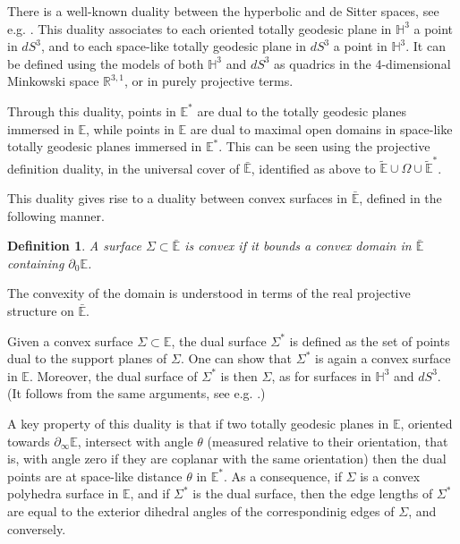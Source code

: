 \documentclass[notitlepage,twoside,a4paper]{amsart}
\newtheorem{definition}[theorem]{\rm\bf Definition}
\theoremstyle{named}
\newcommand{\HH}{{\mathbb H}}
\newcommand{\R}{{\mathbb R}}
\newcommand{\bE}{{\mathbb E}}
\begin{document}
There is a well-known duality between the hyperbolic and de Sitter spaces, see e.g. \cite{HR,shu,fillastre-seppi:spherical}. This duality associates to each oriented totally geodesic plane in $\HH^3$ a point in $dS^3$, and to each space-like totally geodesic plane in $dS^3$ a point in $\HH^3$. It can be defined using the models of both $\HH^3$ and $dS^3$ as quadrics in the 4-dimensional Minkowski space $\R^{3,1}$, or in purely projective terms.

Through this duality, points in $\bE^*$ are dual to the totally geodesic planes immersed in $\bE$, while points in $\bE$ are dual to maximal open domains in space-like totally geodesic planes immersed in $\bE^*$. This can be seen using the projective definition duality, in the universal cover of $\bar\bE$, identified as above to $\tilde\bE\cup \Omega\cup \tilde\bE^*$.

This duality gives rise to a duality between convex surfaces in $\bar \bE$, defined in the following manner.

\begin{definition}
  A surface $\Sigma\subset \bar \bE$ is {\em convex} if it bounds a convex domain in $\bar \bE$ containing $\partial_0\bE$. 
\end{definition}

The convexity of the domain is understood in terms of the real projective structure on $\bar\bE$.

Given a convex surface $\Sigma\subset \bE$, the dual surface $\Sigma^*$ is defined as the set of points dual to the support planes of $\Sigma$. One can show that $\Sigma^*$ is again a convex surface in $\bE$. Moreover, the dual surface of $\Sigma^*$ is then $\Sigma$, as for surfaces in $\HH^3$ and $dS^3$. (It follows from the same arguments, see e.g. \cite{HR,shu}.)

A key property of this duality is that if two totally geodesic planes in $\bE$, oriented towards $\partial_\infty \bE$, intersect with angle $\theta$ (measured relative to their orientation, that is, with angle zero if they are coplanar with the same orientation) then the dual points are at space-like distance $\theta$ in $\bE^*$. As a consequence, if $\Sigma$ is a convex polyhedra surface in $\bE$, and if $\Sigma^*$ is the dual surface, then the edge lengths of $\Sigma^*$ are equal to the exterior dihedral angles of the correspondinig edges of $\Sigma$, and conversely.
\end{document}

